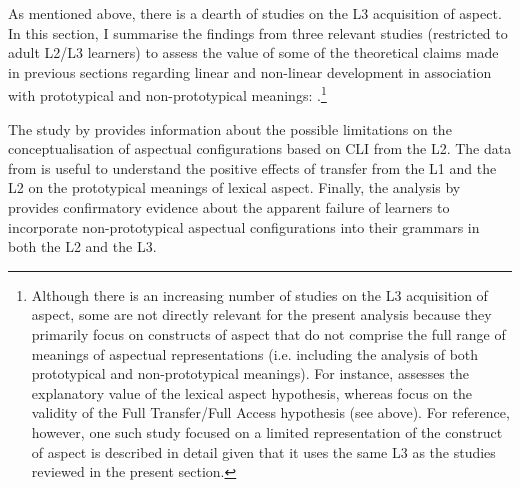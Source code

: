 \documentclass[output=paper,modfonts,nonflat,newtxmath]{langsci/langscibook}
\begin{document}
As mentioned above, there is a dearth of studies on the L3 acquisition of aspect. In this section, I summarise the findings from three relevant studies (restricted to adult L2/L3 learners) to assess the value of some of the theoretical claims made in previous sections regarding linear and non-linear development in association with prototypical and non-prototypical meanings: \citet{Salaberry2005, Foote2009, DiaubalickGuijarro-Fuentes2016}.\footnote{Although there is an increasing number of studies on the L3 acquisition of aspect, some are not directly relevant for the present analysis because they primarily focus on constructs of aspect that do not comprise the full range of meanings of aspectual representations (i.e. including the analysis of both prototypical and non-prototypical meanings). For instance, \citet{Fessi2013} assesses the explanatory value of the lexical aspect hypothesis, whereas \citet{KarpavaEtAl2012} focus on the validity of the Full Transfer/Full Access hypothesis (see  above). For reference, however, one such study focused on a limited representation of the construct of aspect \citep{Foote2009} is described in detail given that it uses the same L3 as the studies reviewed in the present section.}

The study by \citeauthor{Salaberry2005} provides information about the possible limitations on the conceptualisation of aspectual configurations based on CLI from the L2. The data from \citeauthor{Foote2009} is useful to understand the positive effects of transfer from the L1 and the L2 on the prototypical meanings of lexical aspect. Finally, the analysis by \citeauthor{DiaubalickGuijarro-Fuentes2016} provides confirmatory evidence about the apparent failure of learners to incorporate non-prototypical aspectual configurations into their grammars in both the L2 and the L3.
\end{document}
